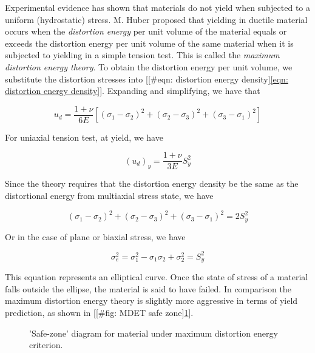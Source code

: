 \documentclass[a4paper,openany,12pt]{book}
\begin{document}
Experimental evidence has shown that materials do not yield when
subjected to a uniform (hydrostatic) stress. M. Huber proposed that
yielding in ductile material occurs when the \emph{distortion energy} per
unit volume of the material equals or exceeds the distortion energy per
unit volume of the same material when it is subjected to yielding in a
simple tension test. This is called the \emph{maximum distortion energy
theory}. To obtain the distortion energy per unit volume, we substitute
the distortion stresses into
[[\#eqn: distortion energy density]\ref{eqn: distortion energy density}].
Expanding and simplifying, we have that

$$u_d = \frac{1 + \nu}{6E}\left[ (\sigma_1 - \sigma_2)^2 + (\sigma _2 - \sigma_3)^2 + (\sigma_3 - \sigma_1)^2 \right]$$

For uniaxial tension test, at yield, we have

$$(u_d)_y = \frac{1 + \nu}{3E}S_y^2$$

Since the theory requires that the distortion energy density be the same
as the distortional energy from multiaxial stress state, we have

$$(\sigma_1 - \sigma_2)^2 + (\sigma_2 - \sigma_3)^2 + (\sigma_3 - \sigma_1)^2 = 2S_y^2$$

Or in the case of plane or biaxial stress, we have

$$\sigma_e^2 = \sigma_1^2 - \sigma_1\sigma_2 + \sigma_2^2 = S_y^2$$

This equation represents an elliptical curve. Once the state of stress
of a material falls outside the ellipse, the material is said to have
failed. In comparison the maximum distortion energy theory is slightly
more aggressive in terms of yield prediction, as shown in
[[\#fig: MDET safe zone]\ref{fig: MDET safe zone}].

\begin{figure}[h]
  \centering
  \caption{'Safe-zone' diagram for material under maximum distortion energy criterion.}
  \label{fig: MDET safe zone}
\end{figure}
\end{document}
